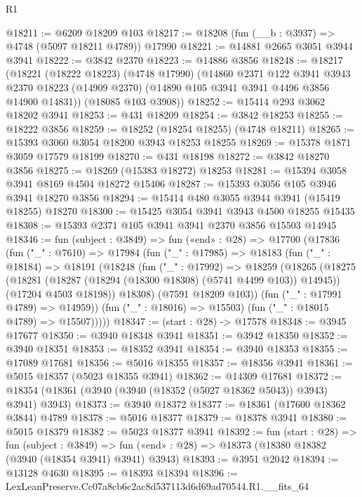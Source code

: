 \begin{lexlean}{R1}
\begin{coremodule}
@18211 := @6209 @18209 @103
@18217 := @18208 (fun (__b : @3937) => @4748 (@5097 @18211 @4789)) @17990
@18221 := @14881 @2665 @3051 @3944 @3941
@18222 := @3842 @2370
@18223 := @14886 @3856
@18248 := @18217
    (@18221
      (@18222 @18223)
      (@4748 @17990)
      (@14860
        @2371
        @122
        @3941
        @3943
        @2370
        @18223
        (@14909 @2370)
        (@14890 @105 @3941 @3941 @4496 @3856 @14900 @14831))
      (@18085 @103 @3908))
@18252 := @15414 @293 @3062 @18202 @3941
@18253 := @431 @18209
@18254 := @3842 @18253
@18255 := @18222 @3856
@18259 := @18252 (@18254 @18255) (@4748 @18211)
@18265 := @15393 @3060 @3054 @18200 @3943 @18253 @18255
@18269 := @15378 @1871 @3059 @17579 @18199
@18270 := @431 @18198
@18272 := @3842 @18270 @3856
@18275 := @18269 (@15383 @18272) @18253
@18281 := @15394 @3058 @3941 @8169 @4504 @18272 @15406
@18287 := @15393 @3056 @105 @3946 @3941 @18270 @3856
@18294 := @15414 @480 @3055 @3944 @3941 (@15419 @18255) @18270
@18300 := @15425 @3054 @3941 @3943 @4500 @18255 @15435
@18308 := @15393 @2371 @105 @3941 @3941 @2370 @3856 @15503 @14945
@18346 := fun (subject : @3849) =>
  fun («end» : @28) =>
  @17700
    (@17836
      (fun ("_" : @7610) =>
      @17984
        (fun ("_" : @17985) =>
        @18183
          (fun ("_" : @18184) =>
          @18191
            (@18248
              (fun ("_" : @17992) =>
              @18259
                (@18265
                  (@18275
                    (@18281 (@18287 (@18294 (@18300 @18308) (@5741 @4499 @103)) @14945))
                    (@17204 @4503 @18198))
                  @18308)
                (@7591 @18209 @103))
              (fun ("_" : @17991 @4789) => @14959))
            (fun ("_" : @18016) => @15503)
            (fun ("_" : @18015 @4789) => @15507)))))
@18347 := (start : @28) -> @17578
@18348 := @3945 @17677
@18350 := @3940 @18348 @3941
@18351 := @3942 @18350
@18352 := @3940 @18351
@18353 := @18352 @3941
@18354 := @3940 @18353
@18355 := @17089 @17681
@18356 := @5016 @18355
@18357 := @18356 @3941
@18361 := @5015 @18357 (@5023 @18355 @3941)
@18362 := @14309 @17681
@18372 := @18354 (@18361 (@3940 (@3940 (@18352 (@5027 @18362 @5043)) @3943) @3941) @3943)
@18373 := @3940 @18372
@18377 := @18361 (@17600 @18362 @3844) @4789
@18378 := @5016 @18377
@18379 := @18378 @3941
@18380 := @5015 @18379
@18382 := @5023 @18377 @3941
@18392 := fun (start : @28) =>
  fun (subject : @3849) =>
  fun («end» : @28) => @18373 (@18380 @18382 (@3940 (@18354 @3941) @3941) @3943)
@18393 := @3951 @2042
@18394 := @13128 @4630
@18395 := @18393 @18394
@18396 := LexLeanPreserve.Cc07a8cb6c2ac8d537113d6d69ad70544.R1.__fits_64

\end{coremodule}
\end{lexlean}
